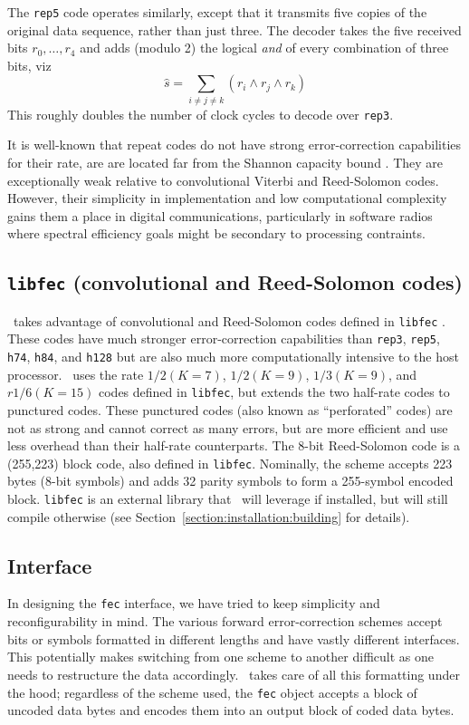 The {\tt rep5} code operates similarly, except that it transmits five copies
of the original data sequence, rather than just three.
The decoder takes the five received bits $r_0,\ldots,r_4$ and adds (modulo
2) the logical {\it and} of every combination of three bits, viz
\[
    \hat{s} = \sum_{i\ne j \ne k} {(r_i \land r_j \land r_k)}
\]
This roughly doubles the number of clock cycles to decode over {\tt rep3}.

It is well-known that repeat codes do not have strong error-correction
capabilities for their rate, are are located far from the Shannon capacity
bound \cite{Proakis:2001}.
They are exceptionally weak relative to convolutional Viterbi and Reed-Solomon
codes.
However, their simplicity in implementation and low computational complexity
gains them a place in digital communications, particularly in software radios
where spectral efficiency goals might be secondary to processing contraints.

\subsection{{\tt libfec} (convolutional and  Reed-Solomon codes)}
\label{module:fec:libfecv}
\liquid\ takes advantage of convolutional and Reed-Solomon codes defined in
{\tt libfec} \cite{libfec:web}.
These codes have much stronger error-correction capabilities than {\tt rep3},
{\tt rep5}, {\tt h74}, {\tt h84}, and {\tt h128}
but are also much more computationally intensive to the host processor.
\liquid\ uses the rate $1/2 (K=7)$, $1/2 (K=9)$, $1/3 (K=9)$, and
$r1/6 (K=15)$ codes defined in {\tt libfec}, but extends the two half-rate
codes to punctured codes.
These punctured codes (also known as ``perforated'' codes) are not as strong
and cannot correct as many errors, but are more efficient and use less
overhead than their half-rate counterparts.
%
The 8-bit Reed-Solomon code is a (255,223) block code, also defined in
{\tt libfec}.
Nominally, the scheme accepts 223 bytes (8-bit symbols) and adds 32 parity
symbols to form a 255-symbol encoded block.
%
{\tt libfec} is an external library that \liquid\ will leverage if
installed, but will still compile otherwise
(see Section~\ref{section:installation:building} for details).

\subsection{Interface}
\label{module:fec:interface}
In designing the {\tt fec} interface, we have tried to keep simplicity and
reconfigurability in mind.
The various forward error-correction schemes accept bits or symbols
formatted in different lengths and have vastly different interfaces.
This potentially makes switching from one scheme to another difficult as one
needs to restructure the data accordingly.
\liquid\ takes care of all this formatting under the hood; regardless of the
scheme used, the {\tt fec} object accepts a block of uncoded data bytes and
encodes them into an output block of coded data bytes.

